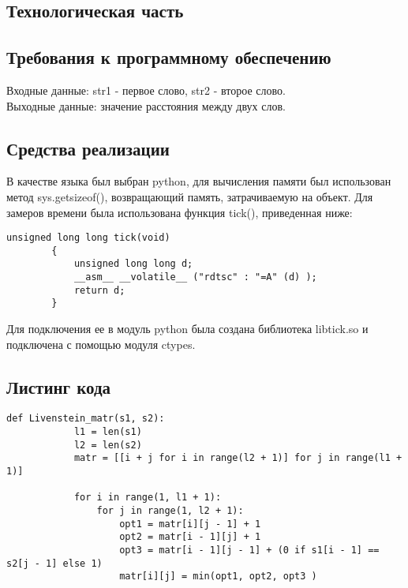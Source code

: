 \documentclass[a4paper, 14pt]{article}
\begin{document}
    \begin{center}
    	\newpage
        \section{Технологическая часть}

        \subsection{Требования к программному обеспечению}
        \begin{flushleft}
        Входные данные: str1 - первое слово, str2 - второе слово.\\
		Выходные данные: значение расстояния между двух слов.

		\subsection{Средства реализации}
		\begin{flushleft}
		В качестве языка был выбран python, для вычисления памяти был использован метод sys.getsizeof(), возвращающий память, затрачиваемую на объект. Для замеров времени была использована функция tick(), приведенная ниже:
		\begin{lstlisting}[label=some-code,caption=Функция замера времени]
		unsigned long long tick(void)
		{
    		unsigned long long d;
    		__asm__ __volatile__ ("rdtsc" : "=A" (d) );
    		return d;
		}
		\end{lstlisting}
		Для подключения ее в модуль python была создана библиотека libtick.so и подключена с помощью модуля ctypes.
		\end{flushleft}
        \subsection{Листинг кода}
        \begin{flushleft}
        \parindent=1cm
        \begin{lstlisting}[label=some-code,caption=Функция нахождения расстояния Левенштейна итеративно]
  		def Livenstein_matr(s1, s2):
    		l1 = len(s1)
    		l2 = len(s2)
		    matr = [[i + j for i in range(l2 + 1)] for j in range(l1 + 1)]
    
		    for i in range(1, l1 + 1):
        		for j in range(1, l2 + 1):
		            opt1 = matr[i][j - 1] + 1
        		    opt2 = matr[i - 1][j] + 1
            		opt3 = matr[i - 1][j - 1] + (0 if s1[i - 1] == s2[j - 1] else 1)
            		matr[i][j] = min(opt1, opt2, opt3 )
  		  	            

\end{lstlisting}
\end{flushleft}
\end{flushleft}
\end{center}
\end{document}
